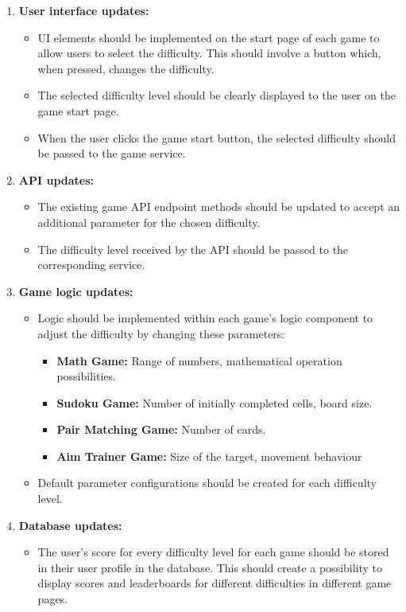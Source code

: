 \documentclass[11pt,a4paper]{article}
\begin{document}
\begin{enumerate}
    \item \textbf{User interface updates:}
    \begin{itemize}
        \item UI elements should be implemented on the start page of each game to allow users to select the difficulty. This should involve a button which, when pressed, changes the difficulty.
    	\item The selected difficulty level should be clearly displayed to the user on the game start page.
    	\item When the user clicks the game start button, the selected difficulty should be passed to the game service.
    \end{itemize}
    \item \textbf{API updates:}
    \begin{itemize}
        \item The existing game API endpoint methods should be updated to accept an additional parameter for the chosen difficulty.
    	\item The difficulty level received by the API should be passed to the corresponding service.
    \end{itemize}
    \item \textbf{Game logic updates:}
    \begin{itemize}
        \item Logic should be implemented within each game's logic component to adjust the difficulty by changing these parameters:
    			\begin{itemize}
    				\item \textbf{Math Game:} Range of numbers, mathematical operation possibilities.
    				\item \textbf{Sudoku Game:} Number of initially completed cells, board size.
    				\item \textbf{Pair Matching Game:} Number of cards.
    				\item \textbf{Aim Trainer Game:} Size of the target, movement behaviour
    			\end{itemize}
    		\item Default parameter configurations should be created for each difficulty level.
    	 
    \end{itemize}
    \item \textbf{Database updates:}
    \begin{itemize}
        \item The user's score for every difficulty level for each game should be stored in their user profile in the database. This should create a possibility to display scores and leaderboards for different difficulties in different game pages. 
    \end{itemize}
\end{enumerate}
\end{document}

